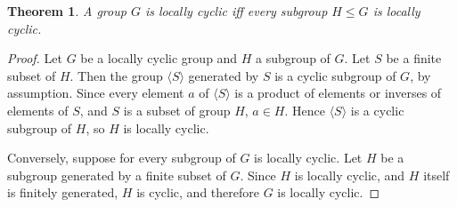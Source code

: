 \documentclass[12pt]{article}
\newtheorem{thm}{Theorem}
\begin{document}
\begin{thm}
A group $G$ is locally cyclic iff every subgroup $H\le G$ is locally cyclic.
\end{thm}

\begin{proof}

Let $G$ be a locally cyclic group and $H$ a subgroup of $G$.  Let $S$ be a finite subset of $H$.  Then the group $\langle S\rangle$ generated by $S$ is a cyclic subgroup of $G$, by assumption.  Since every element $a$ of $\langle S\rangle$ is a product of elements or inverses of elements of $S$, and $S$ is a subset of group $H$, $a\in H$.  Hence $\langle S\rangle$ is a cyclic subgroup of $H$, so $H$ is locally cyclic.

Conversely, suppose for every subgroup of $G$ is locally cyclic.  Let $H$ be a subgroup generated by a finite subset of $G$.  Since $H$ is locally cyclic, and $H$ itself is finitely generated, $H$ is cyclic, and therefore $G$ is locally cyclic.
\end{proof}


\end{document}
